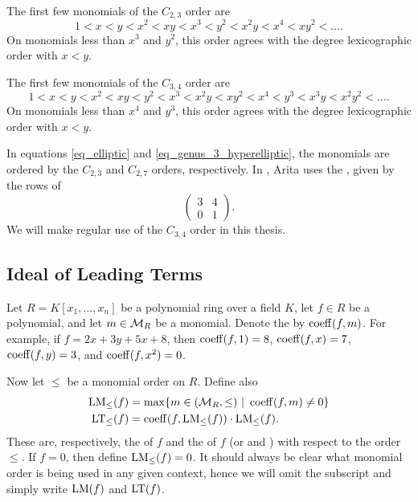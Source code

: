 \begin{example}
  \label{ex_c23_order}
  The first few monomials of the $C_{2,3}$ order are
  \[ 1 < x < y < x^2 < xy < x^3 < y^2 < x^2y < x^4 < xy^2 < \dots. \]
  On monomials less than $x^3$ and $y^2$,
  this order agrees with the degree lexicographic order with $x < y$.
\end{example}
\begin{example}
  \label{ex_c34_order}
  The first few monomials of the $C_{3,4}$ order are
  \[ 1 < x < y < x^2 < xy < y^2 < x^3 < x^2y < xy^2 < x^4 < y^3 < x^3y < x^2y^2 < \dots. \]
  On monomials less than $x^4$ and $y^3$,
  this order agrees with the degree lexicographic order with $x < y$.
\end{example}
In equations \ref{eq_elliptic} and \ref{eq_genus_3_hyperelliptic},
the monomials are ordered by the $C_{2,3}$ and $C_{2,7}$ orders, respectively.
In \cite{arita05-2}, Arita uses the , given by the rows of
\[ \begin{pmatrix} 3 & 4 \\ 0 & 1 \end{pmatrix}. \]
We will make regular use of the $C_{3,4}$ order in this thesis.




\subsection{Ideal of Leading Terms}

Let $R = K[x_1, \ldots, x_n]$ be a polynomial ring over a field $K$,
let $f \in R$ be a polynomial,
and let $m \in \cal M_R$ be a monomial.
Denote the  by $\coeff(f, m)$.
For example, if $f = 2x + 3y + 5x + 8$,
then $\coeff(f, 1) = 8$, $\coeff(f, x) = 7$, $\coeff(f, y) = 3$, and $\coeff(f, x^2) = 0$.

Now let $\leq$ be a monomial order on $R$.
Define also
\begin{align*}
  \LM_\leq(f) &= \max\{ m \in (\cal M_R, \leq) ~|~ \coeff(f, m) \neq 0\} \\
  \LT_\leq(f) &= \coeff(f, \LM_\leq(f)) \cdot \LM_\leq(f).
\end{align*}
These are, respectively, the  of $f$ and the  of $f$
(or  and )
with respect to the order $\leq$.
If $f = 0$, then define $\LM_\leq(f) = 0$.
It should always be clear what monomial order is being used in any given context, 
hence we will omit the subscript and simply write $\LM(f)$ and $\LT(f)$.


